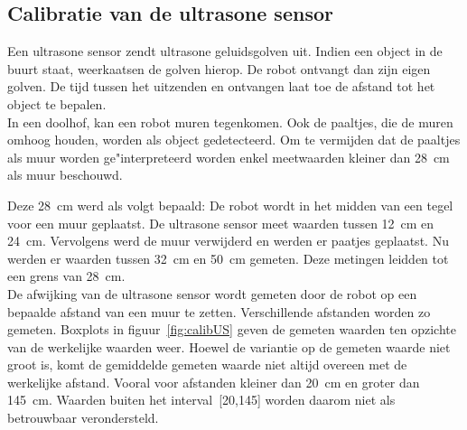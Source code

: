 \documentclass[eind]{penoverslag}
\begin{document}
\subsection{Calibratie van de ultrasone sensor} %
\label{ssec:calibUS}
Een ultrasone sensor zendt ultrasone geluidsgolven uit. Indien een object in de buurt staat, weerkaatsen de golven hierop. De robot ontvangt dan zijn eigen golven. De tijd tussen het uitzenden en ontvangen laat toe de afstand tot het object te bepalen.\\

In een doolhof, kan een robot muren tegenkomen. Ook de paaltjes, die de muren omhoog houden, worden als object gedetecteerd. Om te vermijden dat de paaltjes als muur worden ge"interpreteerd worden enkel meetwaarden kleiner dan 28~cm als muur beschouwd.

Deze 28~cm werd als volgt bepaald: De robot wordt in het midden van een tegel voor een muur geplaatst. De ultrasone sensor meet waarden tussen 12~cm en 24~cm. Vervolgens werd de muur verwijderd en werden er paatjes geplaatst. Nu werden er waarden tussen 32~cm en 50~cm gemeten. Deze metingen leidden tot een grens van 28~cm.\\

De afwijking van de ultrasone sensor wordt gemeten door de robot op een bepaalde afstand van een muur te zetten. Verschillende afstanden worden zo gemeten. Boxplots in figuur~\ref{fig:calibUS} geven de gemeten waarden ten opzichte van de werkelijke waarden weer. Hoewel de variantie op de gemeten waarde niet groot is, komt de gemiddelde gemeten waarde niet altijd overeen met de werkelijke afstand. Vooral voor afstanden kleiner dan 20~cm en groter dan 145~cm. Waarden buiten het interval~[20,145] worden daarom niet als betrouwbaar verondersteld.
\end{document}
